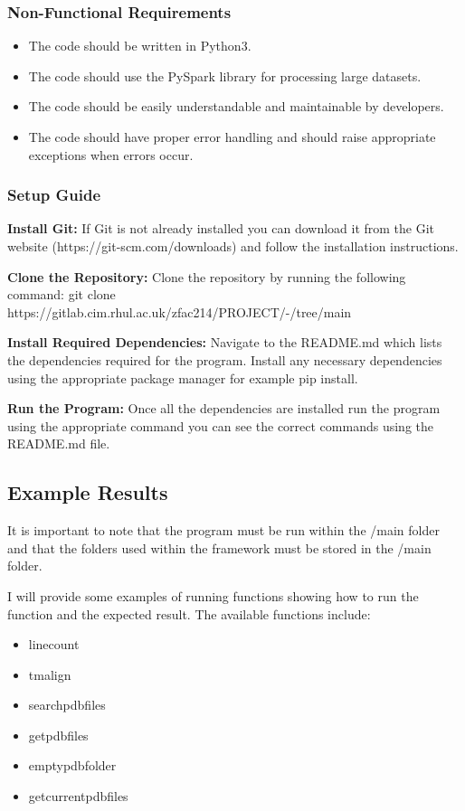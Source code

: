\documentclass[]{final_report}
\begin{document}
\subsubsection{Non-Functional Requirements}

\begin{itemize}
    \item The code should be written in Python3.
    \item The code should use the PySpark library for processing large datasets.
    \item The code should be easily understandable and maintainable by developers.
    \item The code should have proper error handling and should raise appropriate exceptions when errors occur.
\end{itemize}

\subsubsection{Setup Guide}

\textbf{Install Git:} If Git is not already installed you can download it from the Git website (https://git-scm.com/downloads) and follow the installation instructions.

\textbf{Clone the Repository:} Clone the repository by running the following command: git clone https://gitlab.cim.rhul.ac.uk/zfac214/PROJECT/-/tree/main

\textbf{Install Required Dependencies:} Navigate to the README.md which lists the dependencies required for the program. Install any necessary dependencies using the appropriate package manager for example pip install.

\textbf{Run the Program:} Once all the dependencies are installed run the program using the appropriate command you can see the correct commands using the README.md file.

\subsection{Example Results}

It is important to note that the program must be run within the /main folder and that the folders used within the framework must be stored in the /main folder.

I will provide some examples of running functions showing how to run the function and the expected result. The available functions include:

\begin{itemize}
    \item linecount
    \item tmalign
    \item searchpdbfiles
    \item getpdbfiles
    \item emptypdbfolder
    \item getcurrentpdbfiles
\end{itemize}
\end{document}
